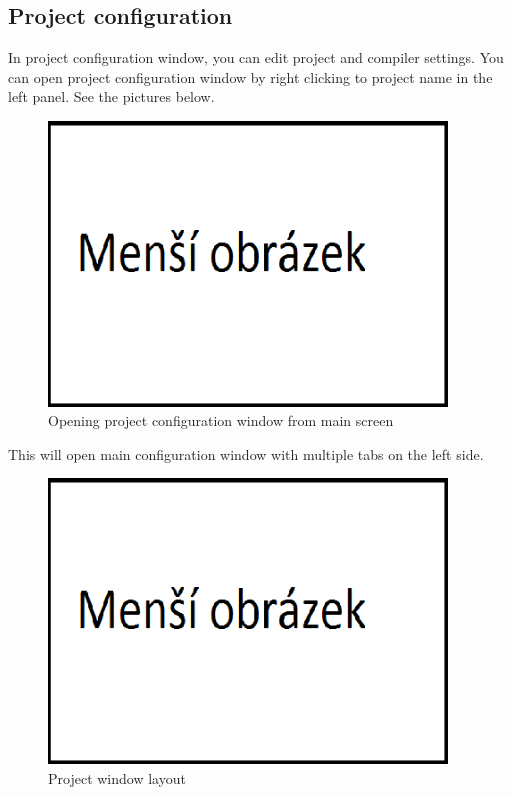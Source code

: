 \subsection{Project configuration}
    In project configuration window, you can edit project and compiler settings. You can open project configuration window by right clicking to project name in the left panel. See the pictures below.
    \begin{figure}
        \centering{}
        \includegraphics [width=300pt]{img/mensi_obrazek.png}
        \caption{Opening project configuration window from main screen}
    \end{figure}

    This will open main configuration window with multiple tabs on the left side.
    \begin{figure}
        \centering{}
        \includegraphics [width=300pt]{img/mensi_obrazek.png}
        \caption{Project window layout}
    \end{figure}

